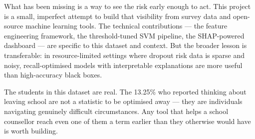 What has been missing is a way to see the risk early enough to act. This project is a small, imperfect attempt to build that visibility from survey data and open-source machine learning tools. The technical contributions --- the feature engineering framework, the threshold-tuned SVM pipeline, the SHAP-powered dashboard --- are specific to this dataset and context. But the broader lesson is transferable: in resource-limited settings where dropout risk data is sparse and noisy, recall-optimised models with interpretable explanations are more useful than high-accuracy black boxes.

The students in this dataset are real. The 13.25\% who reported thinking about leaving school are not a statistic to be optimised away --- they are individuals navigating genuinely difficult circumstances. Any tool that helps a school counsellor reach even one of them a term earlier than they otherwise would have is worth building.

